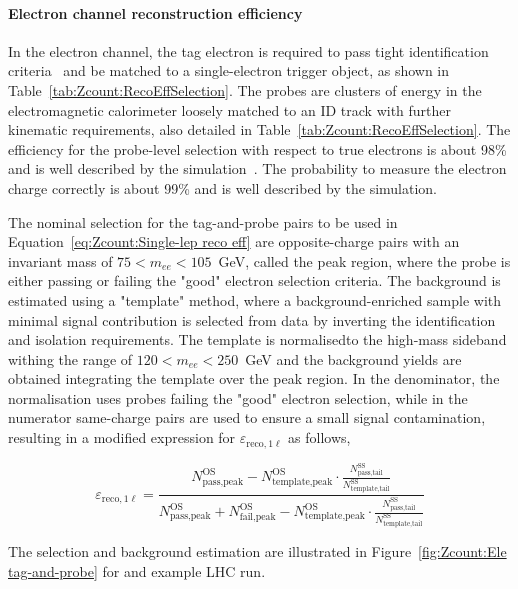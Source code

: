 \paragraph{Electron channel reconstruction efficiency} In the electron channel, the tag electron is required to pass tight identification criteria~\cite{ATLAS:2019jvq} and be matched to a single-electron trigger object, as shown in Table~\ref{tab:Zcount:RecoEffSelection}. The probes are clusters of energy in the electromagnetic calorimeter loosely matched to an ID track with further kinematic requirements, also detailed in Table~\ref{tab:Zcount:RecoEffSelection}. The efficiency for the probe-level selection with respect to true electrons is about 98\% and is well described by the simulation~\cite{ATLAS:2019jvq}. The probability to measure the electron charge correctly is about 99\% and is well described by the simulation.

The nominal selection for the tag-and-probe pairs to be used in Equation~\ref{eq:Zcount:Single-lep reco eff} are opposite-charge pairs with an invariant mass of $75<m_{ee}<105$~GeV, called the peak region, where the probe is either passing or failing the "good" electron selection criteria. The background is estimated using a "template" method, where a background-enriched sample with minimal signal contribution is selected from data by inverting the identification and isolation requirements. The template is normalisedto the high-mass sideband withing the range of $120<m_{ee}<250$~GeV and the background yields are obtained integrating the template over the peak region. In the denominator, the normalisation uses probes failing the "good" electron selection, while in the numerator same-charge pairs are used to ensure a small signal contamination, resulting in a modified expression for $\varepsilon_{\text{reco},1\ell}$ as follows, 

\begin{equation}
	\varepsilon_{\text{reco},1\ell}=\frac{N^\text{OS}_\text{pass,peak}-N^\text{OS}_\text{template,peak}\cdot\frac{N^\text{SS}_\text{pass,tail}}{N^\text{SS}_\text{template,tail}}}{N^\text{OS}_\text{pass,peak}+N^\text{OS}_\text{fail,peak}-N^\text{OS}_\text{template,peak}\cdot\frac{N^\text{SS}_\text{pass,tail}}{N^\text{SS}_\text{template,tail}}}
\end{equation}

The selection and background estimation are illustrated in Figure~\ref{fig:Zcount:Ele tag-and-probe} for and example LHC run.

